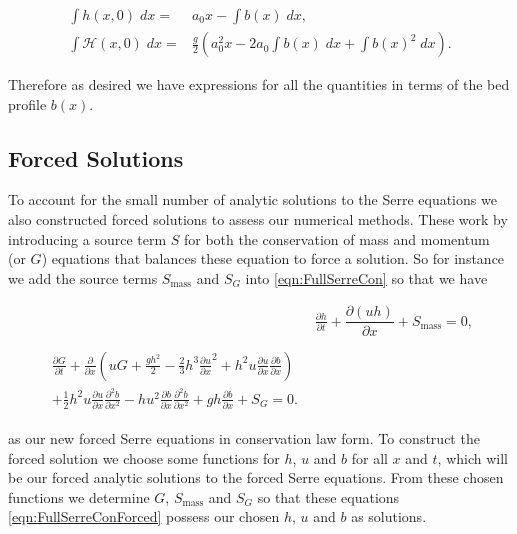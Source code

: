   \begin{subequations}
  	\begin{align}
  	\int h(x,0) \; dx = {} & a_0 x -  \int b(x) \; dx , \\
  	\int \mathcal{H}(x,0) \; dx = {} & \frac{g}{2} \left(a_0^2x  -  2a_0 \int b(x) \; dx + \int b(x)^2 \; dx \right).
  	\end{align}
  \end{subequations}
  
Therefore as desired we have expressions for all the quantities in terms of the bed profile $b(x)$. 


\subsection{Forced Solutions}
To account for the small number of analytic solutions to the Serre equations we also constructed forced solutions to assess our numerical methods. These work by introducing a source term $S$ for both the conservation of mass and  momentum (or $G$) equations that balances these equation to force a solution. So for instance we add the source terms $S_{\text{mass}}$ and $S_{G}$ into \eqref{eqn:FullSerreCon} so that we have


\begin{subequations}
	\label{eqn:FullSerreConForced}
	\begin{align}
	& \frac{\partial h}{\partial t} + \dfrac{\partial (uh)}{\partial x} + S_{\text{mass}}  = 0 ,\label{eqn:FullSerreConMassForced}  \\ \nonumber \\
	\begin{split}
	\label{eqn:SerreconsconmomForced}
	\frac{\partial G}{\partial t}  + \frac{\partial}{\partial x} \left( {u} G + \frac{gh^2}{2} - \frac{2}{3}h^3 \frac{\partial {u}}{\partial x}^2 + h^2 {u}\frac{\partial {u}}{\partial x}\frac{\partial b}{\partial x} \right) \\ + \frac{1}{2}h^2 {u} \frac{\partial {u}}{\partial x} \frac{\partial^2 b}{\partial x^2}  - h {u}^2\frac{\partial b}{\partial x}\frac{\partial^2 b}{\partial x^2} + gh\frac{\partial b}{\partial x} + S_{G} = 0.
	\end{split}
	\end{align}
\end{subequations}

as our new forced Serre equations in conservation law form. To construct the forced solution we choose some functions for $h$, $u$ and $b$ for all $x$ and $t$, which will be our forced analytic solutions to the forced Serre equations. From these chosen functions we determine $G$, $S_{\text{mass}}$ and $S_{G}$ so that these equations \eqref{eqn:FullSerreConForced} possess our chosen $h$, $u$ and $b$ as solutions.

